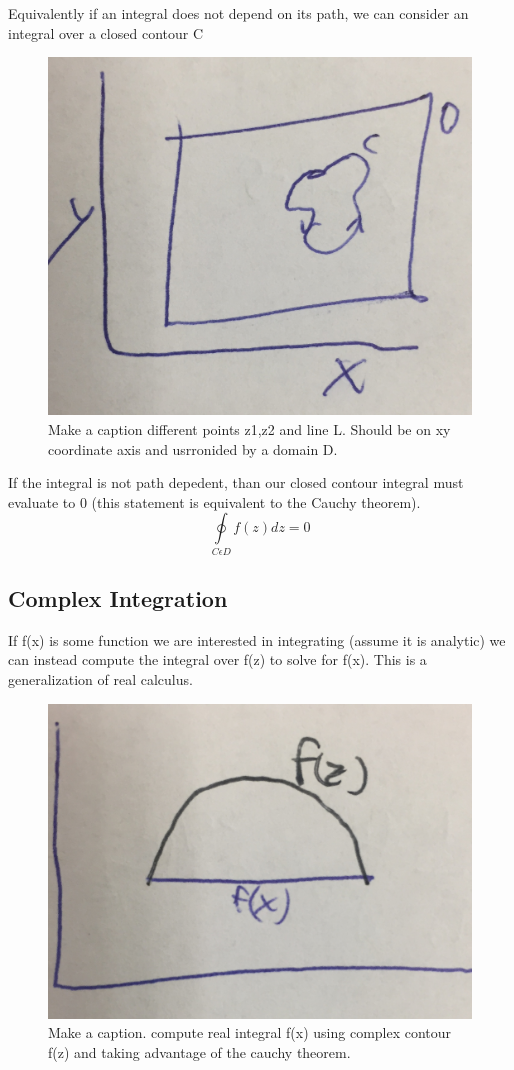 \documentclass{article}
\newcommand{\be}{\begin{equation}}
\newcommand{\ee}{\end{equation}}
\begin{document}
Equivalently if an integral does not depend on its path, we can consider an integral over a closed contour C
\begin{figure}[H]
  \centering
    \includegraphics[scale=0.2]{Figures/contour.png}
    \caption{Make a caption different points z1,z2 and line L. Should be on xy coordinate axis and usrronided by a domain D. }
\end{figure}
If the integral is not path depedent, than our closed contour integral must evaluate to 0 (this statement is equivalent to the Cauchy theorem). 
\be
\oint\limits_{C \epsilon D} f(z) dz = 0
\ee

\subsection*{Complex Integration}
If f(x) is some function we are interested in integrating (assume it is analytic) we can instead compute the integral over f(z) to solve for f(x). 
This is a generalization of real calculus. 
\begin{figure}[H]
  \centering
    \includegraphics[scale=0.2]{Figures/motivation.png}
    \caption{Make a caption. compute real integral f(x) using complex contour f(z) and taking advantage of the cauchy theorem. }
\end{figure}
\end{document}
